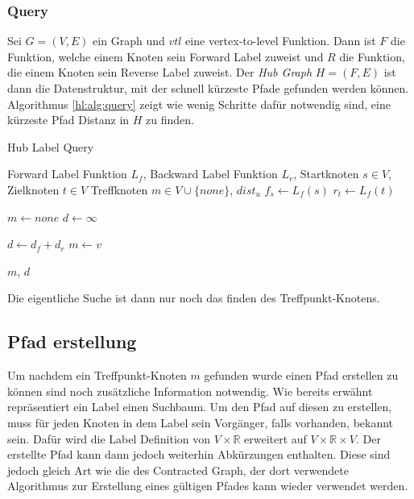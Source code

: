 \subsubsection{Query}

Sei $G = (V, E)$ ein Graph und ${vtl}$ eine vertex-to-level Funktion.
Dann ist $F$ die Funktion, welche einem Knoten sein Forward Label zuweist und $R$ die Funktion, die einem Knoten sein Reverse Label zuweist.
Der \emph{Hub Graph} $H = (F, E)$ ist dann die Datenstruktur, mit der schnell kürzeste Pfade gefunden werden können.
Algorithmus \ref{hl:alg:query} zeigt wie wenig Schritte dafür notwendig sind, eine kürzeste Pfad Distanz in $H$ zu finden.

\begin{algorithm}[ht]
    \caption{Hub Label Query}
    \begin{algorithmic}[1]
        \Require Forward Label Funktion $L_f$, Backward Label Funktion $L_r$, Startknoten $s \in V$, Zielknoten $t \in V$
        \Ensure Treffknoten $m \in V \cup \{ {none} \}$, ${dist}_u$
        \State $f_s \leftarrow L_f (s)$
        \State $r_t \leftarrow L_f (t)$

        \State
        \State $m \leftarrow {none}$
        \State $d \leftarrow \infty$

        \State $d \leftarrow d_f + d_r$
        \State $m \leftarrow v$
        \EndIf
        \EndFor

        \State
        \State \Return $m$, $d$
    \end{algorithmic}
    \label{hl:alg:query}
\end{algorithm}

Die eigentliche Suche ist dann nur noch das finden des Treffpunkt-Knotens.

\subsection{Pfad erstellung}

Um nachdem ein Treffpunkt-Knoten $m$ gefunden wurde einen Pfad erstellen zu können sind noch zusätzliche Information notwendig.
Wie bereits erwähnt repräsentiert ein Label einen Suchbaum.
Um den Pfad auf diesen zu erstellen, muss für jeden Knoten in dem Label sein Vorgänger, falls vorhanden, bekannt sein.
Dafür wird die Label Definition von $V \times \mathbb{R}$ erweitert auf $V \times \mathbb{R} \times V$.
Der erstellte Pfad kann dann jedoch weiterhin Abkürzungen enthalten.
Diese sind jedoch gleich Art wie die des Contracted Graph, der dort verwendete Algorithmus zur Erstellung eines gültigen Pfades kann wieder verwendet werden.



